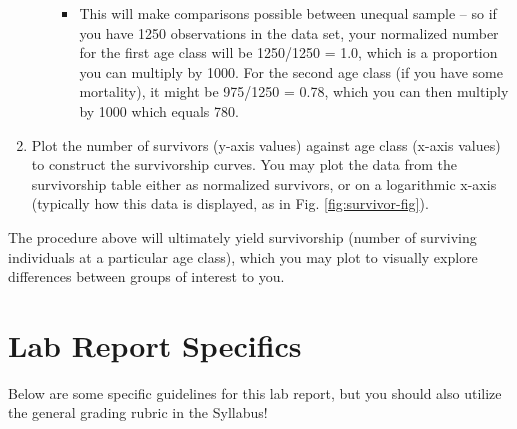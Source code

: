 \documentclass[]{krantz}
\providecommand{\tightlist}{%
  \setlength{\itemsep}{0pt}\setlength{\parskip}{0pt}}
\theoremstyle{definition}
\theoremstyle{definition}
\theoremstyle{definition}
\theoremstyle{remark}
\begin{document}
\begin{enumerate}
\begin{itemize}
    \begin{itemize}
    \tightlist
    \item
      This will make comparisons possible between unequal sample -- so
      if you have 1250 observations in the data set, your normalized
      number for the first age class will be 1250/1250 = 1.0, which is a
      proportion you can multiply by 1000. For the second age class (if
      you have some mortality), it might be 975/1250 = 0.78, which you
      can then multiply by 1000 which equals 780.
    \end{itemize}
  \end{itemize}
\item
  Plot the number of survivors (y-axis values) against age class (x-axis
  values) to construct the survivorship curves. You may plot the data
  from the survivorship table either as normalized survivors, or on a
  logarithmic x-axis (typically how this data is displayed, as in Fig.
  \ref{fig:survivor-fig}).
\end{enumerate}

The procedure above will ultimately yield survivorship (number of
surviving individuals at a particular age class), which you may plot to
visually explore differences between groups of interest to you.

\pagebreak

\section{Lab Report Specifics}\label{lab-report-specifics}

Below are some specific guidelines for this lab report, but you should
also utilize the general grading rubric in the Syllabus!
\end{document}
